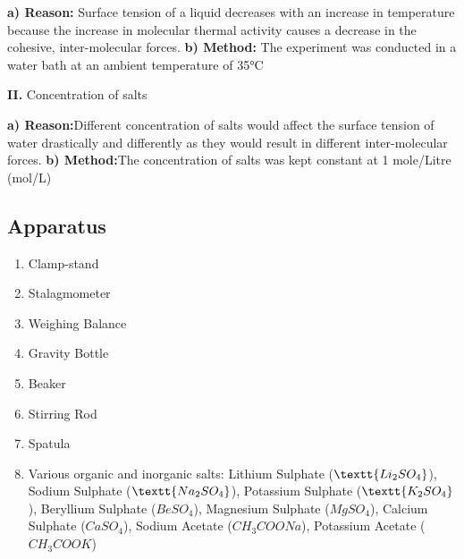 \documentclass{article}
\begin{document}
\hfill\begin{minipage}{\dimexpr\textwidth-1cm}
\vspace{-1.3cm}
\par{\textbf{a) Reason:} Surface tension of a liquid decreases with an increase in temperature because the increase in molecular thermal activity causes a decrease in the cohesive, inter-molecular forces. \footnotemark \protect   \newline \newline
\textbf{b) Method:} The experiment was conducted in a water bath at an ambient temperature of 35°C}
\xdef\tpd{\the\prevdepth}
\end{minipage}


\begin{spacing}{1}
    \hspace{-0.8cm}
    \textbf{II. }Concentration of salts
\end{spacing}

\hfill\begin{minipage}{\dimexpr\textwidth-1cm}
\par{\textbf{a) Reason:}Different concentration of salts would affect the surface tension of water drastically and differently as they would result in different inter-molecular forces.  \newline \newline
\textbf{b) Method:}The concentration of salts was kept constant at 1 mole/Litre (mol/L) \newline}
\xdef\tpd{\the\prevdepth}
\end{minipage}

\subsection{Apparatus}

\begin{enumerate}
    \item Clamp-stand
    \item Stalagmometer
    \item Weighing Balance
    \item Gravity Bottle
    \item Beaker
    \item Stirring Rod
    \item Spatula
    \item Various organic and inorganic salts: Lithium Sulphate ($\textt{Li_{2}SO_{4}}$), Sodium Sulphate ($\textt{Na_{2}SO_{4}}$), Potassium Sulphate ($\textt{K_{2}SO_{4}}$), Beryllium Sulphate ($BeSO_{4}$), Magnesium Sulphate ($MgSO_{4}$), Calcium Sulphate ($CaSO_{4}$), Sodium Acetate ($CH_{3}COONa$), Potassium Acetate ($CH_{3}COOK$)
\end{enumerate}
\end{document}
